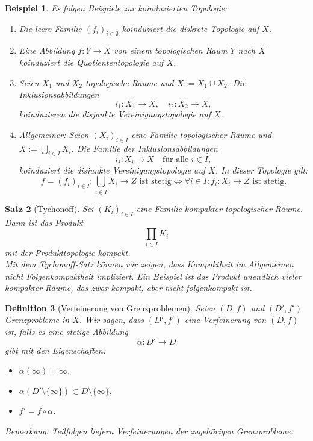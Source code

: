 \documentclass[a4paper,12pt]{article}
\theoremstyle{break}
\newtheorem{definition}{Definition}[section]
\newtheorem{theorem}[definition]{Satz}
\newtheorem{example}[definition]{Beispiel}
\begin{document}
\begin{example}
Es folgen Beispiele zur koinduzierten Topologie:
\begin{enumerate}
    \item Die leere Familie $(f_i)_{i \in \emptyset}$ koinduziert die \emph{diskrete Topologie} auf $X$.
    
    \item Eine Abbildung $f: Y \to X$ von einem topologischen Raum $Y$ nach $X$ koinduziert die \emph{Quotiententopologie} auf $X$.
    
    \item Seien $X_1$ und $X_2$ topologische Räume und $X := X_1 \cup X_2$. Die Inklusionsabbildungen
    \[
    i_1: X_1 \to X, \quad i_2: X_2 \to X,
    \]
    koinduzieren die \emph{disjunkte Vereinigungstopologie} auf $X$.
    
    \item Allgemeiner: Seien $(X_i)_{i \in I}$ eine Familie topologischer Räume und $X := \bigcup_{i \in I} X_i$. Die Familie der Inklusionsabbildungen
    \[
    i_i: X_i \to X \quad \text{für alle } i \in I,
    \]
    koinduziert die \emph{disjunkte Vereinigungstopologie} auf $X$. In dieser Topologie gilt:
    \[
    f = (f_i)_{i \in I}: \bigcup_{i \in I} X_i \to Z \text{ ist stetig} \iff \forall i \in I: f_i: X_i \to Z \text{ ist stetig.}
    \]
\end{enumerate}
\end{example}

\begin{theorem}[Tychonoff]
Sei $(K_i)_{i \in I}$ eine Familie kompakter topologischer Räume. Dann ist das Produkt
\[
\prod_{i \in I} K_i
\]
mit der Produkttopologie kompakt. \\
Mit dem Tychonoff-Satz können wir zeigen, dass Kompaktheit im Allgemeinen nicht Folgenkompaktheit impliziert. Ein Beispiel ist das Produkt unendlich vieler kompakter Räume, das zwar kompakt, aber nicht folgenkompakt ist.
\end{theorem}

\begin{definition}[Verfeinerung von Grenzproblemen]
Seien $(D, f)$ und $(D', f')$ Grenzprobleme in $X$. Wir sagen, dass $(D', f')$ \emph{eine Verfeinerung} von $(D, f)$ ist, falls es eine stetige Abbildung 
\[
\alpha: D' \to D
\]
gibt mit den Eigenschaften:
\begin{itemize}
    \item $\alpha(\infty) = \infty$,
    \item $\alpha(D' \setminus \{\infty\}) \subset D \setminus \{\infty\}$,
    \item $f' = f \circ \alpha$.
\end{itemize}

Bemerkung: Teilfolgen liefern Verfeinerungen der zugehörigen Grenzprobleme.
\end{definition}
\end{document}

